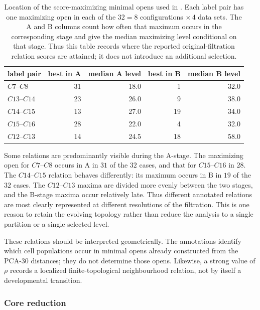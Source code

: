 \documentclass[a4paper,11pt]{article}
\theoremstyle{definition}
\theoremstyle{remark}
\begin{document}
\begin{table}[!ht]
\centering
\small
\caption{Location of the score-maximizing minimal opens used in . Each label pair has one maximizing open in each of the $32=8$ configurations $\times\,4$ data sets. The A and B columns count how often that maximum occurs in the corresponding stage and give the median maximizing level conditional on that stage. Thus this table records where the reported original-filtration relation scores are attained; it does not introduce an additional selection.}
\label{tab:paul15-original-relation-locations}
\setlength{\tabcolsep}{4.5pt}
\begin{tabular}{@{}lrrrr@{}}
\toprule
label pair & best in A & median A level & best in B & median B level \\
\midrule
$C7$--$C8$ & 31 & 18.0 & 1 & 32.0 \\
$C13$--$C14$ & 23 & 26.0 & 9 & 38.0 \\
$C14$--$C15$ & 13 & 27.0 & 19 & 34.0 \\
$C15$--$C16$ & 28 & 22.0 & 4 & 32.0 \\
$C12$--$C13$ & 14 & 24.5 & 18 & 58.0 \\
\bottomrule
\end{tabular}
\end{table}

Some relations are predominantly visible during the A-stage. The maximizing open for $C7$–$C8$ occurs in A in $31$ of the $32$ cases, and that for $C15$–$C16$ in $28$. The $C14$–$C15$ relation behaves differently: its maximum occurs in B in $19$ of the $32$ cases. The $C12$–$C13$ maxima are divided more evenly between the two stages, and the B-stage maxima occur relatively late. Thus different annotated relations are most clearly represented at different resolutions of the filtration. This is one reason to retain the evolving topology rather than reduce the analysis to a single partition or a single selected level.

These relations should be interpreted geometrically. The annotations identify which cell populations occur in minimal opens already constructed from the PCA-30 distances; they do not determine those opens. Likewise, a strong value of $\rho$ records a localized finite-topological neighbourhood relation, not by itself a developmental transition.

\subsubsection*{Core reduction}
\label{subsec:paul15-core}
\end{document}
